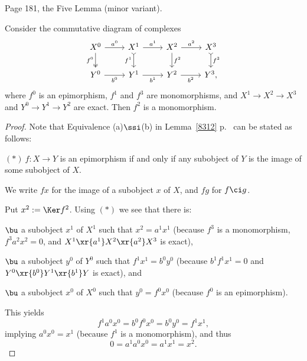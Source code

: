 \documentclass[12pt]{article}
\theoremstyle{remark}
\theoremstyle{definition}
\begin{document}
\begin{s} 
Page 181, the Five Lemma (minor variant). 

\begin{thm} 
Consider the commutative diagram of complexes 
$$
\begin{tikzcd}
X^0\arrow[two heads]{d}[swap]{f^0}\arrow{r}{a^0}&
X^1\arrow[tail]{d}[swap]{f^1}\arrow{r}{a^1}&
X^2\arrow{d}{f^2}\arrow{r}{a^2}&
X^3\arrow[tail]{d}{f^3}\\ 
Y^0\arrow{r}[swap]{b^0}&
Y^1\arrow{r}[swap]{b^1}&
Y^2\arrow{r}[swap]{b^2}&
Y^3,
\end{tikzcd}
$$
where $f^0$ is an epimorphism, $f^1$ and $f^3$ are monomorphisms, and $X^1\to X^2\to X^3$ and $Y^0\to Y^1\to Y^2$ are exact. Then $f^2$ is a monomorphism. 
\end{thm} 

\begin{proof}
Note that Equivalence (a)$\ssi$(b) in Lemma~\ref{8312} p.~ can be stated as follows: 

\nn$(*)\ f:X\to Y$ is an epimorphism if and only if any subobject of $Y$ is the image of some subobject of $X$. 

We write $fx$ for the image of a subobject $x$ of $X$, and $fg$ for $f\ci g$.

Put $x^2:=\Ker f^2$. Using $(*)$ we see that there is: 

\nn$\bu$ a subobject $x^1$ of $X^1$ such that $x^2=a^1x^1$ (because $f^3$ is a monomorphism, $f^3a^2x^2=0$, and $X^1\xr{a^1}X^2\xr{a^2}X^3$ is exact), 

\nn$\bu$ a subobject $y^0$ of $Y^0$ such that $f^1x^1=b^0y^0$ (because $b^1f^1x^1=0$ and $Y^0\xr{b^0}Y^1\xr{b^1}Y$ is exact), and 

\nn$\bu$ a subobject $x^0$ of $X^0$ such that $y^0=f^0x^0$ (because $f^0$ is an epimorphism). 

This yields 
$$
f^1a^0x^0=b^0f^0x^0=b^0y^0=f^1x^1,
$$
implying $a^0x^0=x^1$ (because $f^1$ is a monomorphism), and thus 
$$
0=a^1a^0x^0=a^1x^1=x^2.
$$ 
\end{proof}
\end{s}

%
\end{document}
